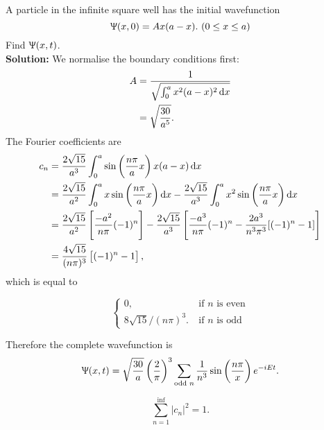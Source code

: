 \begin{wex}
A particle in the infinite square well has the initial wavefunction
\begin{equation}
\Uppsi(x,0)=Ax(a-x).\ (0\leq x\leq a)
\end{equation}
Find $\Uppsi(x,t)$. 
\ \\
\textbf{Solution: }We normalise the boundary conditions first:
\begin{equation}
\begin{aligned}
A&=\frac{1}{\sqrt{\int^a_0x^2(a-x)^2\dx}}\\
&=\sqrt{\frac{30}{a^5}}.
\end{aligned}
\end{equation}
The Fourier coefficients are 
\begin{subequations}
\begin{align}
c_n&=\frac{2\sqrt{15}}{a^3}\int^a_0\sin\left(\frac{n\pi}{a}x\right)x(a-x)\dx\\
&=\frac{2\sqrt{15}}{a^2}\int^a_0 x\sin\left(\frac{n\pi}{a}x\right)\dx-\frac{2\sqrt{15}}{a^3}\int^a_0 x^2\sin\left(\frac{n\pi}{a}x\right)\dx \\
&=\frac{2\sqrt{15}}{a^2}\left[\frac{-a^2}{n\pi}(-1)^n \right]-\frac{2\sqrt{15}}{a^3}\left[\frac{-a^3}{n\pi}(-1)^n-\frac{2a^3}{n^3\pi^3}[(-1)^n-1] \right]\\
&=\frac{4\sqrt{15}}{(n\pi)^3}\left[(-1)^n-1 \right], 
\end{align}
\end{subequations}
which is equal to 
\begin{singlespace}
\begin{equation}
\begin{cases}
0, \ &\text{if $n$ is even}\\
8\sqrt{15}/(n\pi)^3.\ &\text{if $n$ is odd}
\end{cases}
\end{equation}
\end{singlespace}
Therefore the complete wavefunction is 
\begin{equation}
\Uppsi(x,t)=\sqrt{\frac{30}{a}}\left(\frac{2}{\pi}\right)^3\sum_{\text{odd }n}\frac{1}{n^3}\sin\left(\frac{n\pi}{x}\right)e^{-iEt}.
\end{equation}
\end{wex}
\begin{thrm}
\begin{equation}
\sum_{n=1}^{\inf}|c_n|^2=1.
\end{equation}
\end{thrm}
